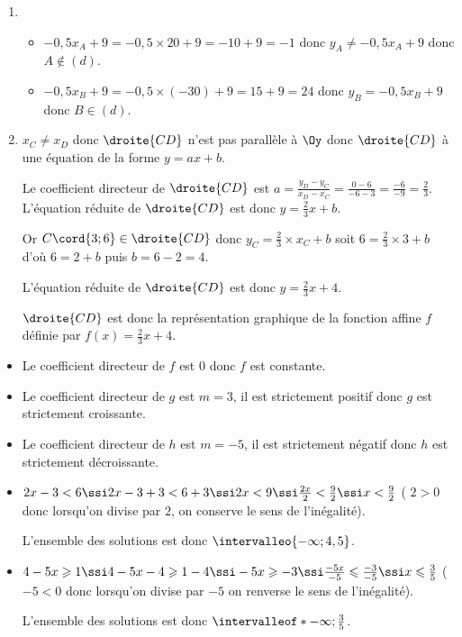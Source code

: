 %
%
%
\begin{exr}
\begin{enumerate}
\item 
    \begin{itemize}
    \item $-0,5x_A+9=-0,5\times 20 +9=-10+9=-1$ donc $y_A\neq -0,5x_A+9$ donc $A\not\in (d)$.
    \item $-0,5x_B+9=-0,5\times (-30) +9=15+9=24$ donc $y_B = -0,5x_B+9$ donc $B\in (d)$.
    \end{itemize}
\item $x_C \neq x_D$ donc $\droite{CD}$ n'est pas parallèle à $\Oy$ donc $\droite{CD}$ à une équation de la forme $y=ax+b$. 

Le coefficient directeur de $\droite{CD}$ est $a=\frac{y_D-y_C}{x_D-x_C}=\frac{0-6}{-6-3}=\frac{-6}{-9}=\frac{2}{3}$. L'équation réduite de $\droite{CD}$ est donc $y=\frac23x+b$.

Or  $C\cord{3;6}\in\droite{CD}$ donc $y_C=\frac23\times x_C + b$ soit $6 = \frac23 \times 3 + b$ d'où $6 = 2 + b$ puis $b = 6-2 = 4$.

L'équation réduite de $\droite{CD}$ est donc $y = \frac23 x + 4$.

$\droite{CD}$ est donc la représentation graphique de la fonction affine $f$ définie par $f(x)=\frac23x+4$.
\end{enumerate}
\end{exr}
%
%
%
\begin{exr}
\begin{itemize}
\item Le coefficient directeur de $f$ est $0$ donc $f$ est constante.
\item Le coefficient directeur de $g$ est $m=3$, il est strictement positif  donc $g$ est strictement croissante.
\item Le coefficient directeur de $h$ est $m=-5$, il est strictement négatif  donc $h$ est strictement décroissante.
\end{itemize}
\end{exr}
%
%
%
\begin{exr}
    \begin{itemize}
    \item $2x-3<6 \ssi 2x-3+3<6+3 \ssi 2x<9 \ssi \frac{2x}{2}<\frac{9}{2} \ssi x<\frac92$ ( $2>0$ donc lorsqu'on divise par $2$, on conserve le sens de l'inégalité).
    
    L'ensemble des solutions est donc $\intervalleo{-\infty;4,5}$.
    \item $4-5x\geqslant 1 \ssi 4-5x-4\geqslant 1-4\ssi -5x \geqslant -3 \ssi \frac{-5x}{-5}\leqslant \frac{-3}{-5}\ssi x\leqslant \frac35$ ($-5<0$ donc lorsqu'on divise par $-5$ on renverse le sens de l'inégalité).
    
    L'ensemble des solutions est donc $\intervalleof*{-\infty;\frac35}$.
    \end{itemize}
\end{exr}
